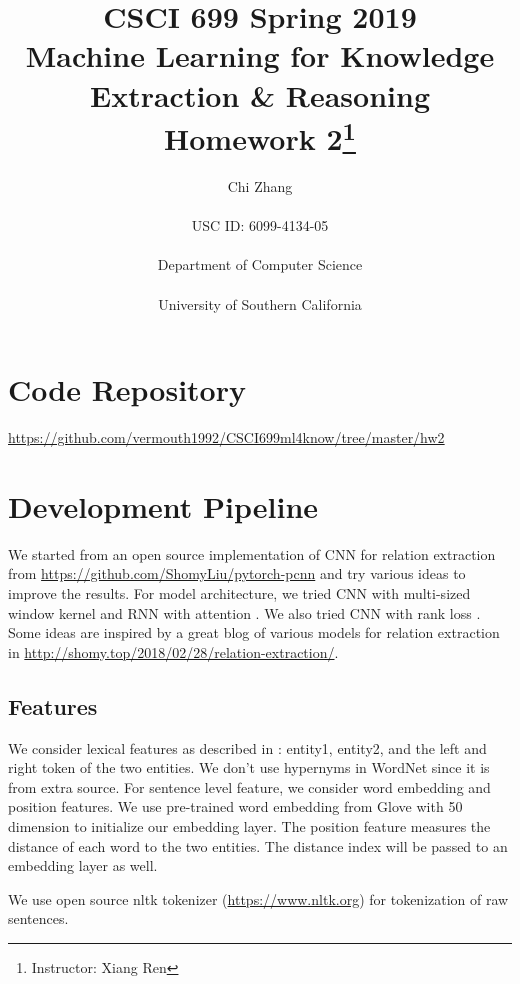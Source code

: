 \documentclass[a4paper]{article}
\author{Chi Zhang\\\\USC ID: 6099-4134-05\\\\Department of Computer Science\\\\University of Southern California}
\title{CSCI 699 Spring 2019\\Machine Learning for Knowledge Extraction \& Reasoning\\Homework 2\thanks{Instructor: Xiang Ren}}
\begin{document}
  \maketitle                     %
  \begin{spacing}{1.0}
 
  \section{Code Repository}
  \url{https://github.com/vermouth1992/CSCI699ml4know/tree/master/hw2}
 
  \section{Development Pipeline}
  We started from an open source implementation of CNN for relation extraction \cite{re_cnn} from \url{https://github.com/ShomyLiu/pytorch-pcnn} and try various ideas to improve the results. For model architecture, we tried CNN with multi-sized window kernel \cite{pcnn} and RNN with attention \cite{Zhou2016AttentionBasedBL}. We also tried CNN with rank loss \cite{cnn_rank_loss}. Some ideas are inspired by a great blog of various models for relation extraction in \url{http://shomy.top/2018/02/28/relation-extraction/}.

   
  \subsection{Features}
  We consider lexical features as described in \cite{re_cnn}: entity1, entity2, and the left and right token of the two entities. We don't use hypernyms in WordNet since it is from extra source. For sentence level feature, we consider word embedding and position features. We use pre-trained word embedding from Glove \cite{glove} with 50 dimension to initialize our embedding layer. The position feature measures the distance of each word to the two entities. The distance index will be passed to an embedding layer as well.
  
  We use open source nltk tokenizer (\url{https://www.nltk.org}) for tokenization of raw sentences. 
  

\end{spacing}
\end{document}

